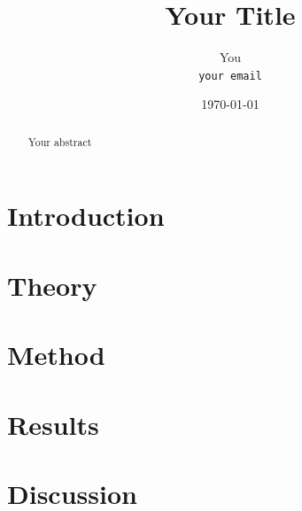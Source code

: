 \documentclass[a4paper,11pt]{article}
\title{Your Title}
\author{You\\
\texttt{your email}}
\date{\today}
\begin{document}
\maketitle
\thispagestyle{empty}
\begin{abstract}
Your abstract
\end{abstract}

\newpage
\tableofcontents
\thispagestyle{plain}
\setcounter{page}{1}



\newpage

\section{Introduction}





\section{Theory}





\section{Method}





\section{Results}





\section{Discussion}
\end{document}
